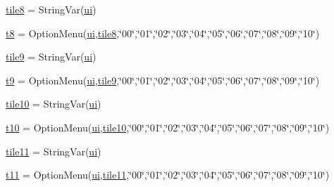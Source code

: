 \begin{DoxyCompactItemize}
\item 
\mbox{\hyperlink{namespacegui_a65c29dc3a8945c02e5d60af809bdc770}{tile8}} = String\+Var(\mbox{\hyperlink{namespacegui_a40ab7281456eadbea2dc2038f5c24fa1}{ui}})
\item 
\mbox{\hyperlink{namespacegui_a589dfadd3354277e8adee92e5bb28ea0}{t8}} = Option\+Menu(\mbox{\hyperlink{namespacegui_a40ab7281456eadbea2dc2038f5c24fa1}{ui}},\mbox{\hyperlink{namespacegui_a65c29dc3a8945c02e5d60af809bdc770}{tile8}},\char`\"{}00\char`\"{},\char`\"{}01\char`\"{},\char`\"{}02\char`\"{},\char`\"{}03\char`\"{},\char`\"{}04\char`\"{},\char`\"{}05\char`\"{},\char`\"{}06\char`\"{},\char`\"{}07\char`\"{},\char`\"{}08\char`\"{},\char`\"{}09\char`\"{},\char`\"{}10\char`\"{})
\item 
\mbox{\hyperlink{namespacegui_a004a4a87f02c662204894326ad5e410f}{tile9}} = String\+Var(\mbox{\hyperlink{namespacegui_a40ab7281456eadbea2dc2038f5c24fa1}{ui}})
\item 
\mbox{\hyperlink{namespacegui_a17f3c9bcfa975e93fed3849a82a3313f}{t9}} = Option\+Menu(\mbox{\hyperlink{namespacegui_a40ab7281456eadbea2dc2038f5c24fa1}{ui}},\mbox{\hyperlink{namespacegui_a004a4a87f02c662204894326ad5e410f}{tile9}},\char`\"{}00\char`\"{},\char`\"{}01\char`\"{},\char`\"{}02\char`\"{},\char`\"{}03\char`\"{},\char`\"{}04\char`\"{},\char`\"{}05\char`\"{},\char`\"{}06\char`\"{},\char`\"{}07\char`\"{},\char`\"{}08\char`\"{},\char`\"{}09\char`\"{},\char`\"{}10\char`\"{})
\item 
\mbox{\hyperlink{namespacegui_adea3a4aee4c39cdfa687e806344201e1}{tile10}} = String\+Var(\mbox{\hyperlink{namespacegui_a40ab7281456eadbea2dc2038f5c24fa1}{ui}})
\item 
\mbox{\hyperlink{namespacegui_a2a2149ea486e425f576234cf2094eafc}{t10}} = Option\+Menu(\mbox{\hyperlink{namespacegui_a40ab7281456eadbea2dc2038f5c24fa1}{ui}},\mbox{\hyperlink{namespacegui_adea3a4aee4c39cdfa687e806344201e1}{tile10}},\char`\"{}00\char`\"{},\char`\"{}01\char`\"{},\char`\"{}02\char`\"{},\char`\"{}03\char`\"{},\char`\"{}04\char`\"{},\char`\"{}05\char`\"{},\char`\"{}06\char`\"{},\char`\"{}07\char`\"{},\char`\"{}08\char`\"{},\char`\"{}09\char`\"{},\char`\"{}10\char`\"{})
\item 
\mbox{\hyperlink{namespacegui_a3c6b012086064f85132d75c185f03f15}{tile11}} = String\+Var(\mbox{\hyperlink{namespacegui_a40ab7281456eadbea2dc2038f5c24fa1}{ui}})
\item 
\mbox{\hyperlink{namespacegui_a2ccbb88e04ba8f0634c4dfacd74c3bac}{t11}} = Option\+Menu(\mbox{\hyperlink{namespacegui_a40ab7281456eadbea2dc2038f5c24fa1}{ui}},\mbox{\hyperlink{namespacegui_a3c6b012086064f85132d75c185f03f15}{tile11}},\char`\"{}00\char`\"{},\char`\"{}01\char`\"{},\char`\"{}02\char`\"{},\char`\"{}03\char`\"{},\char`\"{}04\char`\"{},\char`\"{}05\char`\"{},\char`\"{}06\char`\"{},\char`\"{}07\char`\"{},\char`\"{}08\char`\"{},\char`\"{}09\char`\"{},\char`\"{}10\char`\"{})

\end{DoxyCompactItemize}
